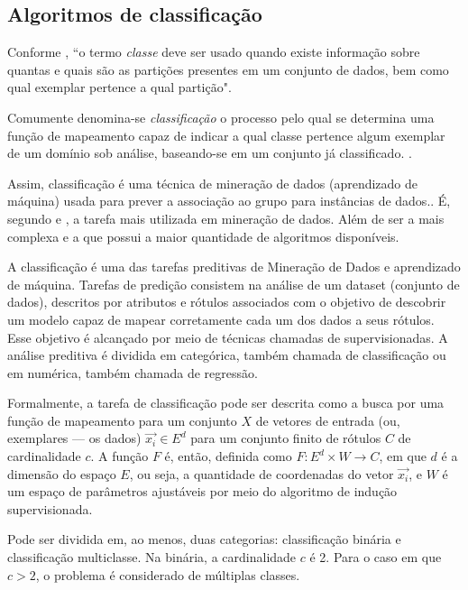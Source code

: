 \subsection{Algoritmos de classificação}
Conforme \cite{Rocha2012}, ``o termo \textit{classe} deve ser usado quando existe informação sobre quantas e quais são as partições presentes em um conjunto de dados, bem como qual exemplar pertence a qual partição".

Comumente denomina-se \textit{classificação} o processo pelo qual se determina uma função de mapeamento capaz de indicar a qual classe pertence algum exemplar de um domínio sob análise, baseando-se em um conjunto já classificado. \cite{Boscarioli2017}.

Assim, classificação é uma técnica de mineração de dados (aprendizado de máquina) usada para prever a associação ao grupo para instâncias de dados.\cite{classification2013}. É, segundo \cite{aprenda_mineracao_fernando_amaral16} e \cite{performance_classification2013}, a tarefa mais utilizada em mineração de dados. Além de ser a mais complexa e a que possui a maior quantidade de algoritmos disponíveis.\cite{classification2013}	

A classificação é uma das tarefas preditivas de Mineração de Dados e aprendizado de máquina. Tarefas de predição consistem na análise de um dataset (conjunto de dados), descritos por atributos e rótulos associados com o objetivo de descobrir um modelo capaz de mapear corretamente cada um dos dados a seus rótulos. Esse objetivo é alcançado por meio de técnicas chamadas de supervisionadas. A análise preditiva é dividida em categórica, também chamada de classificação ou em numérica, também chamada de regressão. \cite{Boscarioli2017} \cite{classification2013} \cite{ferrari2017} \cite{goldschmidt2005}

Formalmente, a tarefa de classificação pode ser descrita como a busca por uma função de mapeamento para um conjunto $X$ de vetores de entrada (ou, exemplares --- os dados) $\vec{x_i} \in E^d$ para um conjunto finito de rótulos $C$ de cardinalidade $c$. A função $F$ é, então, definida como $F: E^d \times W \rightarrow C$, em que $d$ é a dimensão do espaço $E$, ou seja, a quantidade de coordenadas do vetor $\vec{x_i}$, e $W$ é um espaço de parâmetros ajustáveis por meio do algoritmo de indução supervisionada. \cite{Boscarioli2017}

Pode ser dividida em, ao menos, duas categorias: classificação binária e classificação multiclasse. Na binária, a cardinalidade $c$ é 2. Para o caso em que $c > 2$, o problema é considerado de múltiplas classes.\cite{Boscarioli2017}

